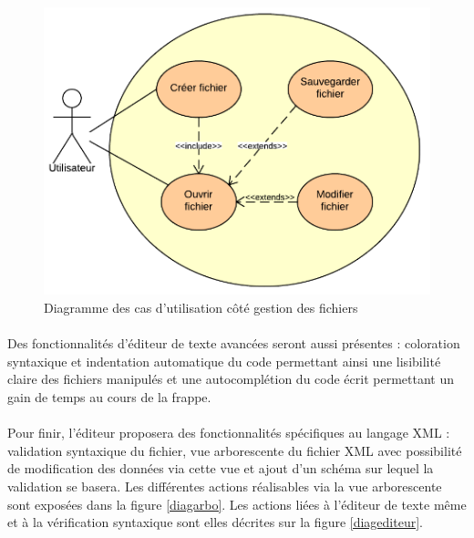 \begin{figure}[h!]
\begin{minipage}[b]{\linewidth}
\centering \includegraphics[scale=0.5]{images/analyse-diag-fichier.png}
\caption{Diagramme des cas d'utilisation côté gestion des fichiers}
\label{diagfichier}
\end{minipage}
\end{figure}

\paragraph{}
Des fonctionnalités d'éditeur de texte avancées seront aussi présentes : coloration syntaxique et indentation automatique du code permettant ainsi une lisibilité claire des fichiers manipulés et une autocomplétion du code écrit permettant un gain de temps au cours de la frappe.
\paragraph{}
Pour finir, l'éditeur proposera des fonctionnalités spécifiques au langage XML : validation syntaxique du fichier, vue arborescente du fichier XML avec possibilité de modification des données via cette vue et ajout d'un schéma sur lequel la validation se basera. Les différentes actions réalisables via la vue arborescente sont exposées dans la figure \ref{diagarbo}. Les actions liées à l'éditeur de texte même et à la vérification syntaxique sont elles décrites sur la figure \ref{diagediteur}.

